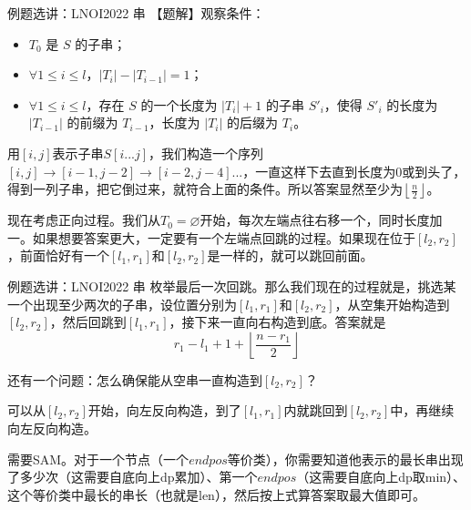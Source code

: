 \documentclass{beamer}
\begin{document}
\begin{frame}{例题选讲：LNOI2022 串}
    \small
    【题解】观察条件：
    \begin{itemize}
        \item $T_0$ 是 $S$ 的子串；
        \item $\forall 1 \le i \le l$，$\lvert T_i \rvert - \lvert T_{i - 1} \rvert = 1$；
        \item $\forall 1 \le i \le l$，存在 $S$ 的一个长度为 $\lvert T_i \rvert + 1$ 的子串 $S'_i$，使得 $S'_i$ 的长度为 $\lvert T_{i - 1} \rvert$ 的前缀为 $T_{i - 1}$，长度为 $\lvert T_i \rvert$ 的后缀为 $T_i$。
    \end{itemize}

    用$[i,j]$表示子串$S[i...j]$，我们构造一个序列$[i,j]\to [i-1,j-2]\to [i-2,j-4]...$，一直这样下去直到长度为$0$或到头了，得到一列子串，把它倒过来，就符合上面的条件。所以答案显然至少为$\left\lfloor\frac{n}{2}\right\rfloor$。

    \pause \vspace{1em}
    现在考虑正向过程。我们从$T_0=\varnothing$开始，每次左端点往右移一个，同时长度加一。如果想要答案更大，一定要有一个左端点回跳的过程。如果现在位于$[l_2,r_2]$，前面恰好有一个$[l_1,r_1]$和$[l_2,r_2]$是一样的，就可以跳回前面。
\end{frame}

\begin{frame}{例题选讲：LNOI2022 串}
    \small
    枚举最后一次回跳。那么我们现在的过程就是，挑选某一个出现至少两次的子串，设位置分别为$[l_1,r_1]$和$[l_2,r_2]$，从空集开始构造到$[l_2,r_2]$，然后回跳到$[l_1,r_1]$，接下来一直向右构造到底。答案就是
    \begin{equation*}
        r_1-l_1+1+\left\lfloor\frac{n-r_1}{2}\right\rfloor
    \end{equation*}

    \pause \vspace{1em}
    还有一个问题：怎么确保能从空串一直构造到$[l_2,r_2]$？

    \pause \vspace{1em}
    可以从$[l_2,r_2]$开始，向左反向构造，到了$[l_1,r_1]$内就跳回到$[l_2,r_2]$中，再继续向左反向构造。

    \pause \vspace{1em}
    需要SAM。对于一个节点（一个$endpos$等价类），你需要知道他表示的最长串出现了多少次（这需要自底向上dp累加）、第一个$endpos$（这需要自底向上dp取min）、这个等价类中最长的串长（也就是len），然后按上式算答案取最大值即可。
\end{frame}
\end{document}
